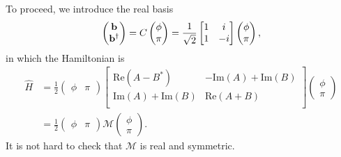 To proceed, we introduce the real basis 
\begin{equation}\begin{aligned}
\label{eq:real_basis}
\begin{pmatrix}
{\bf b}\\
{\bf b}^\dagger
\end{pmatrix}
=C\begin{pmatrix}
\phi\\
\pi
\end{pmatrix}
=\frac{1}{\sqrt{2}}\begin{bmatrix}
1 & i \\
1 & -i
\end{bmatrix}\begin{pmatrix}
\phi\\
\pi
\end{pmatrix},
\end{aligned}\end{equation}
in which the Hamiltonian is
\begin{equation}\begin{aligned}
\hat{H}
&=\frac{1}{2}
\begin{pmatrix}
\phi & \pi
\end{pmatrix}
\begin{bmatrix}
\text{Re}(A-B^*) & -\text{Im}(A)+\text{Im}(B)\\
\text{Im}(A)+\text{Im}(B)& \text{Re}(A+B) \\
\end{bmatrix}
\begin{pmatrix}
\phi\\
\pi
\end{pmatrix} \\
&=\frac{1}{2}
\begin{pmatrix}
\phi & \pi
\end{pmatrix}
\mathcal{M}
\begin{pmatrix}
\phi\\
\pi
\end{pmatrix}.
\end{aligned}\end{equation}
It is not hard to check that $\mathcal{M}$ is real and symmetric. 

